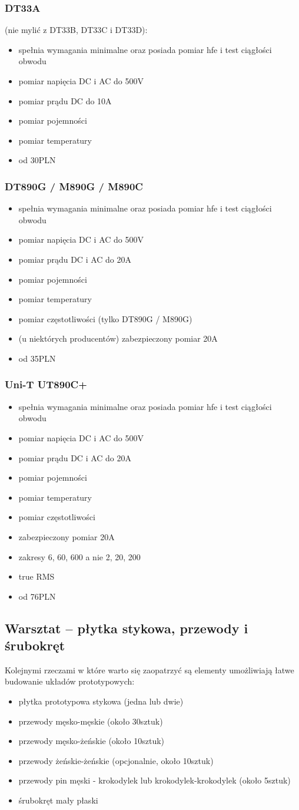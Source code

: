 \documentclass{pdfBooklets}
\newcommand\zaleta{\item[\textbf{\ttfamily +}]}
\newcommand\info{\item[\textbf{\ttfamily *}]}
\begin{document}
	\subsubsection{DT33A} (nie mylić z DT33B, DT33C i DT33D):
		\begin{itemize}
			\zaleta spełnia wymagania minimalne oraz posiada pomiar hfe i test ciągłości obwodu
			\zaleta pomiar napięcia DC i AC do 500V
			\zaleta pomiar prądu DC do 10A
			\zaleta pomiar pojemności
			\zaleta pomiar temperatury
			\info od 30PLN
		\end{itemize}
	
	\subsubsection{DT890G / M890G / M890C}
		\begin{itemize}
			\zaleta spełnia wymagania minimalne oraz posiada pomiar hfe i test ciągłości obwodu
			\zaleta pomiar napięcia DC i AC do 500V
			\zaleta pomiar prądu DC i AC do 20A
			\zaleta pomiar pojemności
			\zaleta pomiar temperatury
			\zaleta pomiar częstotliwości (tylko DT890G / M890G)
			\zaleta (u niektórych producentów) zabezpieczony pomiar 20A
			\info od 35PLN
		\end{itemize}
	
	\subsubsection{Uni-T UT890C+}
		\begin{itemize}
			\zaleta spełnia wymagania minimalne oraz posiada pomiar hfe i test ciągłości obwodu
			\zaleta pomiar napięcia DC i AC do 500V
			\zaleta pomiar prądu DC i AC do 20A
			\zaleta pomiar pojemności
			\zaleta pomiar temperatury
			\zaleta pomiar częstotliwości
			\zaleta zabezpieczony pomiar 20A
			\zaleta zakresy 6, 60, 600 a nie 2, 20, 200
			\zaleta true RMS
			\info od 76PLN
		\end{itemize}

\subsection{Warsztat – płytka stykowa, przewody i śrubokręt}
	Kolejnymi rzeczami w które warto się zaopatrzyć są elementy umożliwiają łatwe budowanie układów prototypowych:
	\begin{itemize}
		\item płytka prototypowa stykowa (jedna lub dwie)
		\item przewody męsko-męskie (około 30sztuk)
		\item przewody męsko-żeńskie (około 10sztuk)
		\item przewody żeńskie-żeńskie (opcjonalnie, około 10sztuk)
		\item przewody pin męski - krokodylek lub krokodylek-krokodylek (około 5sztuk)
		\item śrubokręt mały płaski
	\end{itemize}
	
\end{document}
